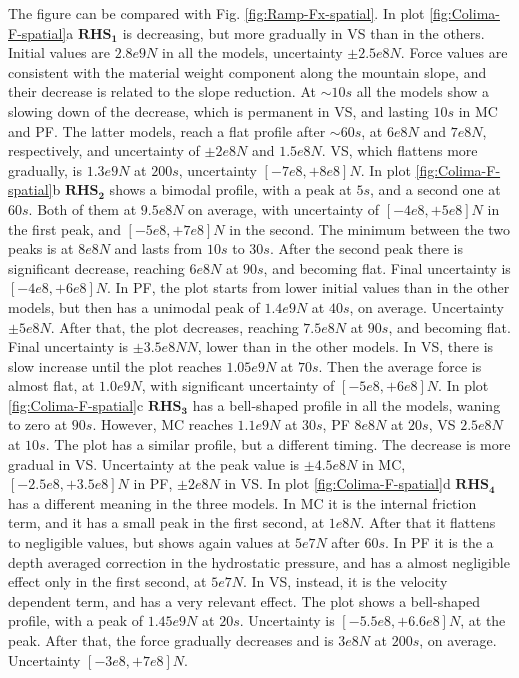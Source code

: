 \documentclass{article}
\begin{document}
The figure can be compared with Fig. \ref{fig:Ramp-Fx-spatial}. In plot \ref{fig:Colima-F-spatial}a $\boldsymbol{RHS_1}$ is decreasing, but more gradually in VS than in the others. Initial values are $2.8e9 N$ in all the models, uncertainty $\pm 2.5e8 N$. Force values are consistent with the material weight component along the mountain slope, and their decrease is related to the slope reduction. At $\sim 10 s$ all the models show a slowing down of the decrease, which is permanent in VS, and lasting $10 s$ in MC and PF. The latter models, reach a flat profile after $\sim 60 s$, at $6e8 N$ and $7e8 N$, respectively, and uncertainty of $\pm 2e8 N$ and $1.5e8 N$. VS, which flattens more gradually, is $1.3e9 N$ at $200 s$, uncertainty $[-7e8,+8e8] N$. In plot \ref{fig:Colima-F-spatial}b $\boldsymbol{RHS_2}$ shows a bimodal profile, with a peak at $5 s$, and a second one at $60 s$. Both of them at $9.5e8 N$ on average, with uncertainty of $[-4e8,+5e8] N$ in the first peak, and $[-5e8,+7e8] N$ in the second. The minimum between the two peaks is at $8e8 N$ and lasts from $10 s$ to $30 s$. After the second peak there is significant decrease, reaching $6e8 N$ at $90 s$, and becoming flat. Final uncertainty is $[-4e8, +6e8] N$. In PF, the plot starts from lower initial values than in the other models, but then has a unimodal peak of $1.4e9 N$ at $40 s$, on average. Uncertainty $\pm 5e8 N$. After that, the plot decreases, reaching $7.5e8 N$ at $90 s$, and becoming flat. Final uncertainty is $\pm 3.5e8 N N$, lower than in the other models. In VS, there is slow increase until the plot reaches $1.05e9 N$ at $70 s$. Then the average force is almost flat, at $1.0e9 N$, with significant uncertainty of $[-5e8,+6e8] N$. In plot \ref{fig:Colima-F-spatial}c $\boldsymbol{RHS_3}$ has a bell-shaped profile in all the models, waning to zero at $90 s$. However, MC reaches $1.1e9 N$ at $30 s$, PF $8e8 N$ at $20 s$, VS $2.5e8 N$ at $10 s$. The plot has a similar profile, but a different timing. The decrease is more gradual in VS. Uncertainty at the peak value is $\pm 4.5e8 N$ in MC, $[-2.5e8,+3.5e8] N$ in PF, $\pm 2e8 N$ in VS. In plot \ref{fig:Colima-F-spatial}d $\boldsymbol{RHS_4}$ has a different meaning in the three models. In MC it is the internal friction term, and it has a small peak in the first second, at $1e8 N$. After that it flattens to negligible values, but shows again values at $5e7 N$ after $60 s$. In PF it is the a depth averaged correction in the hydrostatic pressure, and has a almost negligible effect only in the first second, at $5e7 N$. In VS, instead, it is the velocity dependent term, and has a very relevant effect. The plot shows a bell-shaped profile, with a peak of $1.45e9 N$ at $20 s$. Uncertainty is $[-5.5e8, +6.6e8] N$, at the peak. After that, the force gradually decreases and is $3e8 N$ at $200 s$, on average. Uncertainty $[-3e8, +7e8] N$.
\end{document}
